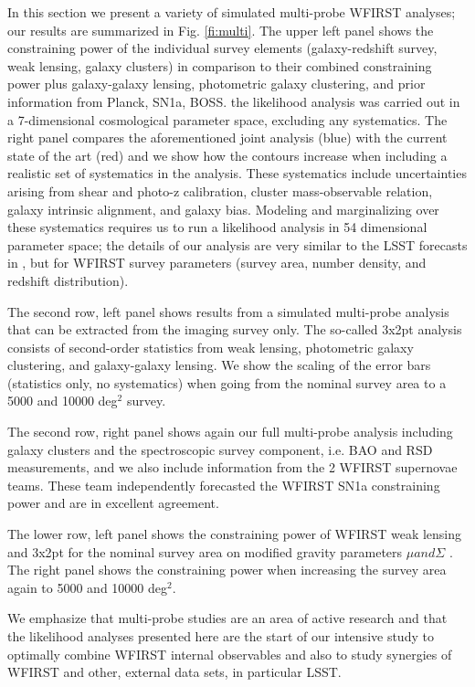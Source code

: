 In this section we present a variety of simulated multi-probe WFIRST analyses; our results are summarized in Fig. \ref{fi:multi}. The upper left panel shows the constraining power of the individual survey elements (galaxy-redshift survey, weak lensing, galaxy clusters) in comparison to their combined constraining power plus galaxy-galaxy lensing, photometric galaxy clustering, and prior information from Planck, SN1a, BOSS. the likelihood analysis was carried out in a 7-dimensional cosmological parameter space, excluding any systematics. The right panel compares the aforementioned joint analysis (blue) with the current state of the art (red) and we show how the contours increase when including a realistic set of systematics in the analysis. These systematics include uncertainties arising from shear and photo-z calibration, cluster mass-observable relation, galaxy intrinsic alignment, and galaxy bias. Modeling and marginalizing over these systematics requires us to run a likelihood analysis in 54 dimensional parameter space; the details of our analysis are very similar to the LSST forecasts in \cite{Krause17}, but for WFIRST survey parameters (survey area, number density, and redshift distribution). 

The second row, left panel shows results from a simulated multi-probe analysis that can be extracted from the imaging survey only. The so-called 3x2pt analysis consists of second-order statistics from weak lensing, photometric galaxy clustering, and galaxy-galaxy lensing. We show the scaling of the error bars (statistics only, no systematics) when going from the nominal survey area to a 5000 and 10000 deg$^2$ survey.

The second row, right panel shows again our full multi-probe analysis including galaxy clusters and the spectroscopic survey component, i.e. BAO and RSD measurements, and we also include information from the 2 WFIRST supernovae teams. These team independently forecasted the WFIRST SN1a constraining power and are in excellent agreement. 

The lower row, left panel shows the constraining power of WFIRST weak lensing and 3x2pt for the nominal survey area on modified gravity parameters $\mu and \Sigma$ \citep[see e.g.,][for details]{jjk15, baa15}. The right panel shows the constraining power when increasing the survey area again to 5000 and 10000 deg$^2$. 

We emphasize that multi-probe studies are an area of active research and that the likelihood analyses presented here are the start of our intensive study to optimally combine WFIRST internal observables and also to study synergies of WFIRST and other, external data sets, in particular LSST. 




